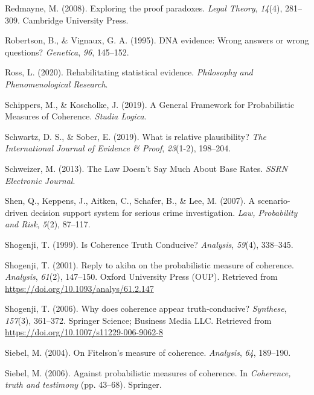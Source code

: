 \documentclass[11pt,dvipsnames,enabledeprecatedfontcommands]{scrartcl}
\begin{document}
\hypertarget{ref-redmayne2008exploring}{}
Redmayne, M. (2008). Exploring the proof paradoxes. \emph{Legal Theory},
\emph{14}(4), 281--309. Cambridge University Press.

\hypertarget{ref-Robertson1995evidence}{}
Robertson, B., \& Vignaux, G. A. (1995). DNA evidence: Wrong answers or
wrong questions? \emph{Genetica}, \emph{96}, 145--152.

\hypertarget{ref-ross2020}{}
Ross, L. (2020). Rehabilitating statistical evidence. \emph{Philosophy
and Phenomenological Research}.

\hypertarget{ref-Schippers2019General}{}
Schippers, M., \& Koscholke, J. (2019). A General Framework for
Probabilistic Measures of Coherence. \emph{Studia Logica}.

\hypertarget{ref-schwartz2019WhatRelativePlausibility}{}
Schwartz, D. S., \& Sober, E. (2019). What is relative plausibility?
\emph{The International Journal of Evidence \& Proof}, \emph{23}(1-2),
198--204.

\hypertarget{ref-schweizer2013LawDoesnSay}{}
Schweizer, M. (2013). The Law Doesn't Say Much About Base Rates.
\emph{SSRN Electronic Journal}.

\hypertarget{ref-shen2007ScenariodrivenDecisionSupporta}{}
Shen, Q., Keppens, J., Aitken, C., Schafer, B., \& Lee, M. (2007). A
scenario-driven decision support system for serious crime investigation.
\emph{Law, Probability and Risk}, \emph{5}(2), 87--117.

\hypertarget{ref-shogenji1999}{}
Shogenji, T. (1999). Is Coherence Truth Conducive? \emph{Analysis},
\emph{59}(4), 338--345.

\hypertarget{ref-Shogenji2001Reply}{}
Shogenji, T. (2001). Reply to akiba on the probabilistic measure of
coherence. \emph{Analysis}, \emph{61}(2), 147--150. Oxford University
Press (OUP). Retrieved from
\url{https://doi.org/10.1093/analys/61.2.147}

\hypertarget{ref-Shogenji2006Why}{}
Shogenji, T. (2006). Why does coherence appear truth-conducive?
\emph{Synthese}, \emph{157}(3), 361--372. Springer Science; Business
Media LLC. Retrieved from
\url{https://doi.org/10.1007/s11229-006-9062-8}

\hypertarget{ref-Siebel2004On-Fitelsons-me}{}
Siebel, M. (2004). On Fitelson's measure of coherence. \emph{Analysis},
\emph{64}, 189--190.

\hypertarget{ref-siebel2006against}{}
Siebel, M. (2006). Against probabilistic measures of coherence. In
\emph{Coherence, truth and testimony} (pp. 43--68). Springer.
\end{document}
